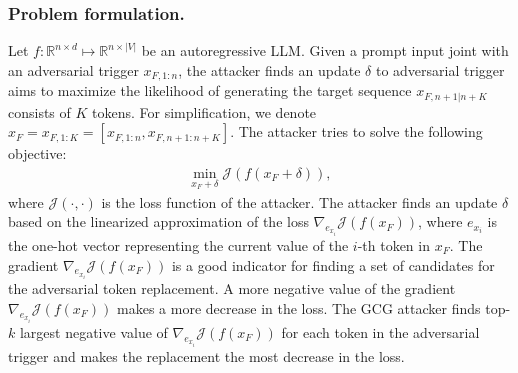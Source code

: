 \documentclass[letterpaper]{article} %
\begin{document}
\subsubsection{Problem formulation.}
Let $f: \mathbb{R}^{n\times d} \mapsto \mathbb{R}^{n\times |V|}$ be an autoregressive LLM. Given a prompt input joint with an adversarial trigger $x_{F,1:n}$, the attacker finds an update $\delta$ to adversarial trigger aims to maximize the likelihood of generating the target sequence $x_{F,n+1|n+K}$ consists of $K$ tokens. For simplification, we denote $x_F = x_{F,1:K} = [x_{F,1:n},x_{F,n+1:n+K}]$. The attacker tries to solve the following objective:
\begin{align}
    \min_{x_F+\delta} \mathcal{J}(f(x_F+\delta)),
\end{align}
where $\mathcal{J}(\cdot,\cdot)$ is the loss function of the attacker. 
The attacker finds an update $\delta$ based on the linearized approximation of the loss $\nabla_{e_{x_i}}\mathcal{J}(f(x_F))$, where $e_{x_i}$ is the one-hot vector representing the current value of the $i$-th token in $x_F$. The gradient $\nabla_{e_{x_i}}\mathcal{J}(f(x_F))$ is a good indicator for finding a set of candidates for the adversarial token replacement. A more negative value of the gradient $\nabla_{e_{x_i}}\mathcal{J}(f(x_F))$ makes a more decrease in the loss. The GCG attacker finds top-$k$ largest negative value of $\nabla_{e_{x_i}}\mathcal{J}(f(x_F))$ for each token in the adversarial trigger and makes the replacement the most decrease in the loss.
\end{document}
